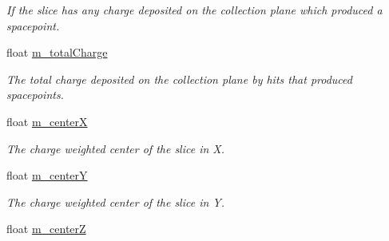 \begin{DoxyCompactItemize}
\begin{DoxyCompactList}\small\item\em If the slice has any charge deposited on the collection plane which produced a spacepoint. \end{DoxyCompactList}\item 
\hypertarget{classflashmatch_1_1FlashMatchingTool_1_1SliceCandidate_afc0e08fdfdf5fedeb5b453b8ed73daca}{float \hyperlink{classflashmatch_1_1FlashMatchingTool_1_1SliceCandidate_afc0e08fdfdf5fedeb5b453b8ed73daca}{m\-\_\-total\-Charge}}\label{classflashmatch_1_1FlashMatchingTool_1_1SliceCandidate_afc0e08fdfdf5fedeb5b453b8ed73daca}

\begin{DoxyCompactList}\small\item\em The total charge deposited on the collection plane by hits that produced spacepoints. \end{DoxyCompactList}\item 
\hypertarget{classflashmatch_1_1FlashMatchingTool_1_1SliceCandidate_aed295480a0baeb1f6f4dfed439d2ff3a}{float \hyperlink{classflashmatch_1_1FlashMatchingTool_1_1SliceCandidate_aed295480a0baeb1f6f4dfed439d2ff3a}{m\-\_\-center\-X}}\label{classflashmatch_1_1FlashMatchingTool_1_1SliceCandidate_aed295480a0baeb1f6f4dfed439d2ff3a}

\begin{DoxyCompactList}\small\item\em The charge weighted center of the slice in X. \end{DoxyCompactList}\item 
\hypertarget{classflashmatch_1_1FlashMatchingTool_1_1SliceCandidate_a6aea126f0da6c65df399de54f0014db5}{float \hyperlink{classflashmatch_1_1FlashMatchingTool_1_1SliceCandidate_a6aea126f0da6c65df399de54f0014db5}{m\-\_\-center\-Y}}\label{classflashmatch_1_1FlashMatchingTool_1_1SliceCandidate_a6aea126f0da6c65df399de54f0014db5}

\begin{DoxyCompactList}\small\item\em The charge weighted center of the slice in Y. \end{DoxyCompactList}\item 
\hypertarget{classflashmatch_1_1FlashMatchingTool_1_1SliceCandidate_a304e57238fd89b1d48fe0c6ae682af2a}{float \hyperlink{classflashmatch_1_1FlashMatchingTool_1_1SliceCandidate_a304e57238fd89b1d48fe0c6ae682af2a}{m\-\_\-center\-Z}}\label{classflashmatch_1_1FlashMatchingTool_1_1SliceCandidate_a304e57238fd89b1d48fe0c6ae682af2a}


\end{DoxyCompactItemize}
